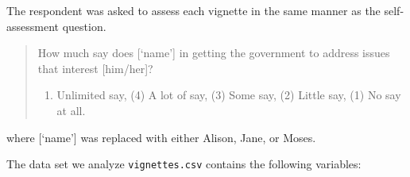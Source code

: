 \documentclass[]{article}
\begin{document}
The respondent was asked to assess each vignette in the same manner as
the self-assessment question.

\begin{quote}
How much say does {[}`name'{]} in getting the government to address
issues that interest {[}him/her{]}?

\begin{enumerate}
\def\labelenumi{(\arabic{enumi})}
\setcounter{enumi}{4}
\itemsep1pt\parskip0pt
\item
  Unlimited say, (4) A lot of say, (3) Some say, (2) Little say, (1) No
  say at all.
\end{enumerate}
\end{quote}

where {[}`name'{]} was replaced with either Alison, Jane, or Moses.

The data set we analyze \texttt{vignettes.csv} contains the following
variables:
\end{document}
